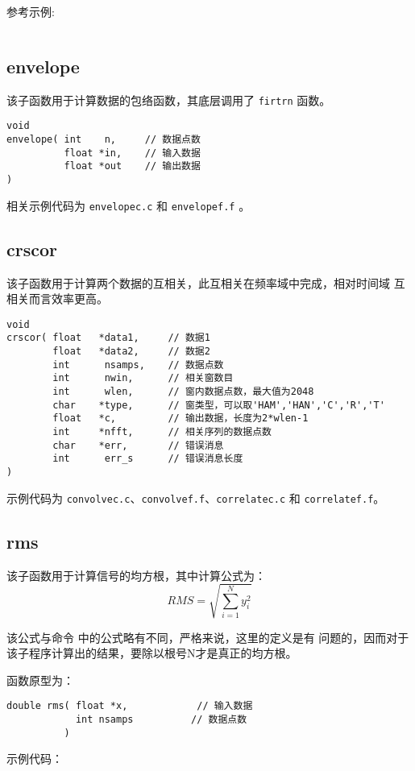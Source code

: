 参考示例:
\inputminted{c}{./libs/firtrn.c}

\subsection{envelope}
该子函数用于计算数据的包络函数，其底层调用了 \texttt{firtrn} 函数。
\begin{verbatim}
void
envelope( int    n,     // 数据点数
          float *in,    // 输入数据
          float *out    // 输出数据
)
\end{verbatim}

相关示例代码为 \texttt{envelopec.c} 和 \texttt{envelopef.f} 。

\subsection{crscor}
该子函数用于计算两个数据的互相关，此互相关在频率域中完成，相对时间域
互相关而言效率更高。

\begin{verbatim}
void
crscor( float   *data1,     // 数据1
        float   *data2,     // 数据2
        int      nsamps,    // 数据点数
        int      nwin,      // 相关窗数目
        int      wlen,      // 窗内数据点数，最大值为2048
        char    *type,      // 窗类型，可以取'HAM','HAN','C','R','T'
        float   *c,         // 输出数据，长度为2*wlen-1
        int     *nfft,      // 相关序列的数据点数
        char    *err,       // 错误消息
        int      err_s      // 错误消息长度
)
\end{verbatim}

示例代码为 \texttt{convolvec.c}、\texttt{convolvef.f}、\texttt{correlatec.c}
和 \texttt{correlatef.f}。

\subsection{rms}
该子函数用于计算信号的均方根，其中计算公式为：
\[
    RMS = \sqrt{\sum_{i=1}^N y_i^2}
\]

该公式与命令  中的公式略有不同，严格来说，这里的定义是有
问题的，因而对于该子程序计算出的结果，要除以根号N才是真正的均方根。

函数原型为：
\begin{verbatim}
double rms( float *x,            // 输入数据
            int nsamps          // 数据点数
          )
\end{verbatim}

示例代码：
\inputminted{c}{./libs/rms.c}
